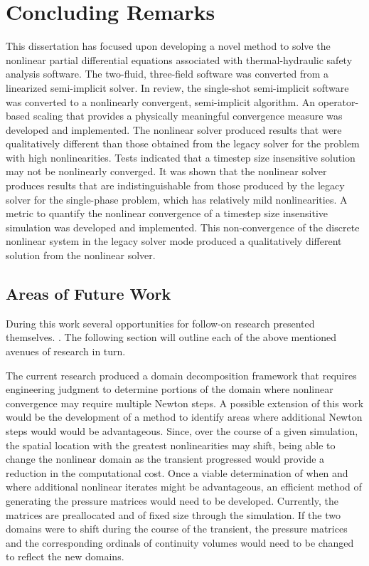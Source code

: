 \chapter{Concluding Remarks}
\label{chap:end}
This dissertation has focused upon developing a novel method to solve the nonlinear partial differential equations associated with thermal-hydraulic safety analysis software.
The two-fluid, three-field software \cobra{} was converted from a linearized semi-implicit solver.
In review, the single-shot semi-implicit \cobra{} software was converted to a nonlinearly convergent, semi-implicit algorithm.
An operator-based scaling that provides a physically meaningful convergence measure was developed and implemented.
The nonlinear solver produced results that were qualitatively different than those obtained from the legacy solver for the problem with high nonlinearities.
Tests indicated that a timestep size insensitive solution may not be nonlinearly converged.
It was shown that the nonlinear solver produces results that are indistinguishable from those produced by the legacy solver for the single-phase problem, which has relatively mild nonlinearities.
A metric to quantify the nonlinear convergence of a timestep size insensitive simulation was developed and implemented.
This non-convergence of the discrete nonlinear system in the legacy solver mode produced a qualitatively different solution from the nonlinear solver.

\section{Areas of Future Work}
\label{sect:futureWork}
During this work several opportunities for follow-on research presented themselves.
.
The following section will outline each of the above mentioned avenues of research in turn.

The current research produced a domain decomposition framework that requires engineering judgment to determine portions of the domain where nonlinear convergence may require multiple Newton steps.
A possible extension of this work would be the development of a method to identify areas where additional Newton steps would would be advantageous.
Since, over the course of a given simulation, the spatial location with the greatest nonlinearities may shift, being able to change the nonlinear domain as the transient progressed would provide a reduction in the computational cost.
Once a viable determination of when and where additional nonlinear iterates might be advantageous, an efficient method of generating the pressure matrices would need to be developed.
Currently, the matrices are preallocated and of fixed size through the simulation.
If the two domains were to shift during the course of the transient, the pressure matrices and the corresponding ordinals of continuity volumes would need to be changed to reflect the new domains.

